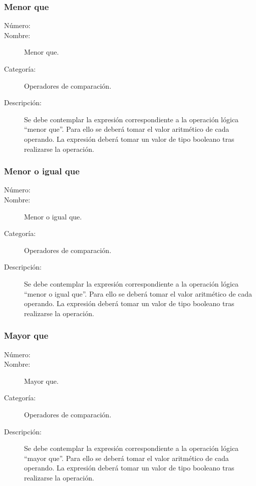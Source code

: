 \subsubsection{Menor que}
	\begin{description}
		\item [Número:] \cn
		\item [Nombre:] Menor que.
		\item [Categoría:] Operadores de comparación.
		\item [Descripción:] Se debe contemplar la expresión correspondiente a la operación lógica ``menor que''. Para ello se deberá tomar
		el valor aritmético de cada operando. La expresión deberá tomar un valor de tipo booleano tras realizarse la operación.
	\end {description}

\subsubsection{Menor o igual que}
	\begin{description}
		\item [Número:] \cn
		\item [Nombre:] Menor o igual que.
		\item [Categoría:] Operadores de comparación.
		\item [Descripción:] Se debe contemplar la expresión correspondiente a la operación lógica ``menor o igual que''. Para ello se deberá tomar
		el valor aritmético de cada operando. La expresión deberá tomar un valor de tipo booleano tras realizarse la operación.
	\end {description}

\subsubsection{Mayor que}
	\begin{description}
		\item [Número:] \cn
		\item [Nombre:] Mayor que.
		\item [Categoría:] Operadores de comparación.
		\item [Descripción:] Se debe contemplar la expresión correspondiente a la operación lógica ``mayor que''. Para ello se deberá tomar
		el valor aritmético de cada operando. La expresión deberá tomar un valor de tipo booleano tras realizarse la operación.
	\end {description}


